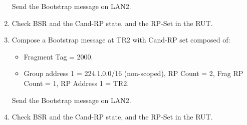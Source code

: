 \documentclass[11pt]{report}
\begin{document}
\begin{enumerate}
\begin{itemize}
  \end{itemize}

  Send the Bootstrap message on LAN2.

  \item Check BSR and the Cand-RP state, and the RP-Set in the RUT.

  \item Compose a Bootstrap message at TR2 with Cand-RP set composed of:

  \begin{itemize}

    \item Fragment Tag = 2000.

    \item Group address 1 = 224.1.0.0/16 (non-scoped),
    RP Count = 2, Frag RP Count = 1, RP Address 1 = TR2.

  \end{itemize}

  Send the Bootstrap message on LAN2.

  \item Check BSR and the Cand-RP state, and the RP-Set in the RUT.

\end{enumerate}

\end{document}
